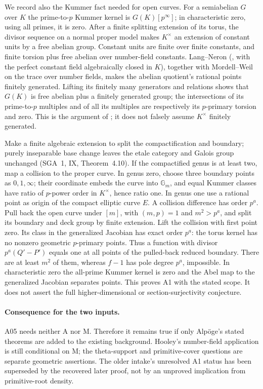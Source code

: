 We record also the Kummer fact needed for open curves. For a
semiabelian $G$ over $K$ the prime-to-$p$ Kummer kernel is
$G(K)[p^\infty]$; in characteristic zero, using all primes,
it is zero. After a finite splitting extension of its torus,
the divisor sequence on a normal proper model makes
$K^\times$ an extension of constant units by a free abelian
group. Constant units are finite over finite constants, and
finite torsion plus free abelian over number-field constants.
Lang--Neron (\cite[Theorem~2.1]{Conrad}, with the perfect constant
field algebraically closed in $K$), together with Mordell--Weil on the trace over
number fields, makes the abelian quotient's rational points
finitely generated. Lifting its finitely many generators and
relations shows that $G(K)$ is free abelian plus a finitely
generated group; the intersections of its prime-to-$p$
multiples and of all its multiples are respectively its
$p$-primary torsion and zero. This is the argument of
\cite[A.30]{A1run}; it does not falsely assume $K^\times$
finitely generated.

Make a finite algebraic extension to split the compactification
and boundary; purely inseparable base change leaves the etale
category and Galois group unchanged (SGA~1, IX,
Theorem~4.10). If the compactified genus is at least two,
map a collision to the proper curve. In genus zero, choose
three boundary points as $0,1,\infty$; their coordinate embeds
the curve into $\mathbb G_m$, and equal Kummer classes have
ratio of $p$-power order in $K^\times$, hence ratio one.
In genus one use a rational point as origin of the compact
elliptic curve $E$. A collision difference has order $p^a$.
Pull back the open curve under $[m]$, with $(m,p)=1$ and
$m^2>p^a$, and split its boundary and deck group by finite
extension. Lift the collision with first point zero. Its class
in the generalized Jacobian has exact order $p^a$: the torus
kernel has no nonzero geometric $p$-primary points. Thus a
function with divisor $p^a(Q'-P')$ equals one at all points
of the pulled-back reduced boundary. There are at least
$m^2$ of them, whereas $f-1$ has pole degree $p^a$, impossible.
In characteristic zero the all-prime Kummer kernel is zero
and the Abel map to the generalized Jacobian separates points.
This proves A1 with the stated scope. It does not assert the
full higher-dimensional or section-surjectivity conjecture.

\paragraph{Consequence for the two inputs.}
A05 needs neither A nor M. Therefore it remains true if only
Alp\"oge's stated theorems are added to the existing background.
Hooley's number-field application is still conditional on M;
the theta-support and primitive-cover questions are separate
geometric assertions. The older intake's unresolved A1 status
has been superseded by the recovered later proof, not by an
unproved implication from primitive-root density.
